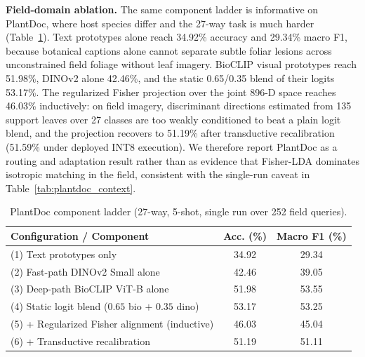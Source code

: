 \textbf{Field-domain ablation.} The same component ladder is informative on PlantDoc, where host species differ and the 27-way task is much harder (Table~\ref{tab:plantdoc_ablation}). Text prototypes alone reach 34.92\% accuracy and 29.34\% macro F1, because botanical captions alone cannot separate subtle foliar lesions across unconstrained field foliage without leaf imagery. BioCLIP visual prototypes reach 51.98\%, DINOv2 alone 42.46\%, and the static 0.65/0.35 blend of their logits 53.17\%. The regularized Fisher projection over the joint 896-D space reaches 46.03\% inductively: on field imagery, discriminant directions estimated from 135 support leaves over 27 classes are too weakly conditioned to beat a plain logit blend, and the projection recovers to 51.19\% after transductive recalibration (51.59\% under deployed INT8 execution). We therefore report PlantDoc as a routing and adaptation result rather than as evidence that Fisher-LDA dominates isotropic matching in the field, consistent with the single-run caveat in Table~\ref{tab:plantdoc_context}.

\begin{table}[htbp]
\caption{PlantDoc component ladder (27-way, 5-shot, single run over 252 field queries).}
\label{tab:plantdoc_ablation}
\centering

\footnotesize
\setlength{\tabcolsep}{3pt}
\begin{tabular*}{\columnwidth}{@{\extracolsep{\fill}}lcc}
\toprule
\textbf{Configuration / Component} & \textbf{Acc. (\%)} & \textbf{Macro F1 (\%)} \\
\midrule
(1) Text prototypes only & 34.92 & 29.34 \\
(2) Fast-path DINOv2 Small alone & 42.46 & 39.05 \\
(3) Deep-path BioCLIP ViT-B alone & 51.98 & 53.55 \\
(4) Static logit blend ($0.65$ bio $+$ $0.35$ dino) & 53.17 & 53.25 \\
(5) + Regularized Fisher alignment (inductive) & 46.03 & 45.04 \\
(6) + Transductive recalibration & 51.19 & 51.11 \\
\bottomrule
\end{tabular*}
\end{table}

